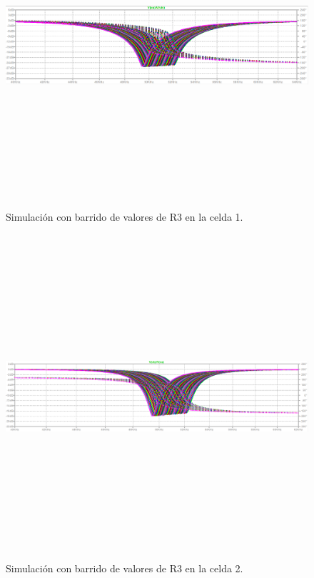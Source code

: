  \begin{figure}[H] %
	\centering	\includegraphics[width=12cm,height=12cm,keepaspectratio]{../EJ4/graficos/etapa1_R3.png}
	\caption{Simulaci\'on con barrido de valores de R3 en la celda 1.}
	\label{celda1_r3}
\end{figure}

 \begin{figure}[H] %
	\centering	\includegraphics[width=12cm,height=12cm,keepaspectratio]{../EJ4/graficos/etapa2_R3.png}
	\caption{Simulaci\'on con barrido de valores de R3 en la celda 2.}
	\label{celda2_r3}
\end{figure}

